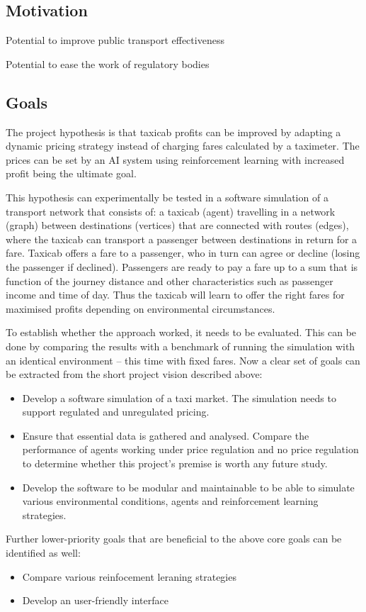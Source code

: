 \subsection{Motivation}
\label{sec:intro:motivation}

Potential to improve public transport effectiveness

Potential to ease the work of regulatory bodies

\subsection{Goals}
\label{sec:intro:goals}

The project hypothesis is that taxicab profits can be improved by adapting a
dynamic pricing strategy instead of charging fares calculated by a taximeter.
The prices can be set by an AI system using reinforcement learning with
increased profit being the ultimate goal. 

This hypothesis can experimentally be tested in a software simulation of a
transport network that consists of: a taxicab (agent) travelling in a network
(graph) between destinations (vertices) that are connected with routes (edges),
where the taxicab can transport a passenger between destinations in return for
a fare. Taxicab offers a fare to a passenger, who in turn can agree or decline
(losing the passenger if declined). Passengers are ready to pay a fare up to a
sum that is function of the journey distance and other  characteristics such as
passenger income and time of day. Thus the taxicab will learn to offer the
right fares for maximised profits depending on environmental circumstances.

To establish whether the approach worked, it needs to be evaluated. This can be
done by comparing the results with a benchmark of running the simulation with an
identical environment -- this time with fixed fares.
Now a clear set of goals can be extracted from the short project vision
described above:

\begin{itemize}
  \item Develop a software simulation of a taxi market. The simulation needs to
        support regulated and unregulated pricing.
  \item Ensure that essential data is gathered and analysed. Compare the 
        performance of agents working under price regulation and no price 
        regulation to determine whether this project's premise is worth any
        future study.
  \item Develop the software to be modular and maintainable to be able to
        simulate various environmental conditions, agents and reinforcement
        learning strategies.
\end{itemize}

Further lower-priority goals that are beneficial to the above core goals can be
identified as well:

\begin{itemize}
  \item Compare various reinfocement leraning strategies
  \item Develop an user-friendly interface
\end{itemize}
